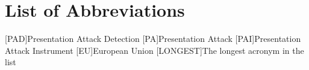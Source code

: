 \chapter*{List of Abbreviations}
\begin{acronym}[LONGEST] %
	[PAD]{Presentation Attack Detection}
	[PA]{Presentation Attack}
	[PAI]{Presentation Attack Instrument}
	[EU]{European Union}
	[LONGEST]{The longest acronym in the list}
\end{acronym}

